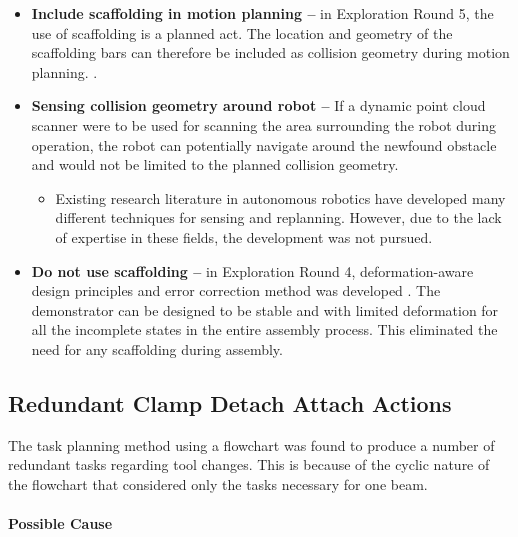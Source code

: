 \begin{itemize}
	\item \textbf{Include scaffolding in motion planning --} in Exploration Round 5, the use of scaffolding is a planned act. The location and geometry of the scaffolding bars can therefore be included as collision geometry during motion planning. .

	\item \textbf{Sensing collision geometry around robot --} If a dynamic point cloud scanner were to be used for scanning the area surrounding the robot during operation, the robot can potentially navigate around the newfound obstacle and would not be limited to the planned collision geometry.

\begin{itemize}
	\item Existing research literature in autonomous robotics have developed many different techniques for sensing and replanning. \parencite{elbanhawiSamplingBasedRobotMotion2014} However, due to the lack of expertise in these fields, the development was not pursued.

\end{itemize}
	\item \textbf{Do not use scaffolding --} in Exploration Round 4, deformation-aware design principles and error correction method was developed . The demonstrator can be designed to be stable and with limited deformation for all the incomplete states in the entire assembly process. This eliminated the need for any scaffolding during assembly.

\end{itemize}

\subsection{Redundant Clamp Detach Attach Actions}
\label{subsection:exploration-3-redundant-clamp-detach-attach-actions}

The task planning method using a flowchart was found to produce a number of redundant tasks regarding tool changes. This is because of the cyclic nature of the flowchart that considered only the tasks necessary for one beam.

\paragraph{Possible Cause}

